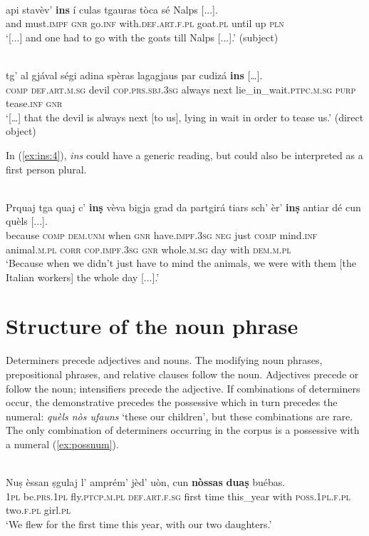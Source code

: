 \ea
\label{ex:ins:2}
\\ 
\gll   [...] api stavèv’ \textbf{ins} í culas tgauras tòca sé Nalps [...]. \\
{} and  must.\textsc{impf} \textsc{gnr} go.\textsc{inf} with.\textsc{def.art.f.pl} goat.\textsc{pl} until up  \textsc{pln}\\
\glt `[...] and one had to go with the goats till Nalps [...].' (subject)
\z

\ea
\label{ex:ins:3}
\\
\gll  […] tg’ al gjával ségi adina spèras lagagjaus par cudizá \textbf{ins} […].\\
{}  \textsc{comp} \textsc{def.art.m.sg} devil \textsc{cop.prs.sbj.3sg} always next lie\_in\_wait.\textsc{ptpc.m.sg} \textsc{purp} tease.\textsc{inf} \textsc{gnr}\\
\glt `[…] that the devil is always next [to us], lying in wait in order to tease us.' (direct object)
\z

In (\ref{ex:ins:4}), \textit{ins} could have a generic reading, but could also be interpreted as a first person plural.

\ea
\label{ex:ins:4}
\\ 
\gll  Prquaj tga quaj c’ \textbf{inṣ} vèva bigja grad da partgirá tiars sch’ èr’ \textbf{inṣ} antiar dé cun quèls [...].  \\
because \textsc{comp} \textsc{dem.unm} when \textsc{gnr} have.\textsc{impf.3sg}  \textsc{neg} just \textsc{comp} mind.\textsc{inf} animal.\textsc{m.pl} \textsc{corr} \textsc{cop.impf.3sg} \textsc{gnr} whole.\textsc{m.sg} day with \textsc{dem.m.pl}\\
\glt `Because when we didn’t just have to mind the animals, we were with them [the Italian workers] the whole day [...].'
\z

\section{Structure of the noun phrase}
Determiners precede adjectives and nouns. The modifying noun phrases, prepositional phrases, and relative clauses follow the noun. Adjectives precede or follow the noun; intensifiers precede the adjective. If combinations of determiners occur, the demonstrative precedes the possessive which in turn precedes the numeral: \textit{quèls nòs ufauns} `these our children', but these combinations are rare. The only combination of determiners occurring in the corpus is a possessive with a numeral (\ref{ex:possnum}).

\ea
\label{ex:possnum}
\\ 
	\gll  Nuṣ èssan ṣgulaj l’ amprém’ jèd’ uòn, cun \textbf{nòssas} \textbf{duaṣ} buébas.\\
\textsc{1pl} be.\textsc{prs.1pl} fly.\textsc{ptcp.m.pl} \textsc{def.art.f.sg} first time this\_year with \textsc{poss.1pl.f.pl} two.\textsc{f.pl} girl.\textsc{pl}\\
\glt `We flew for the first time this year, with our two daughters.'
\z


